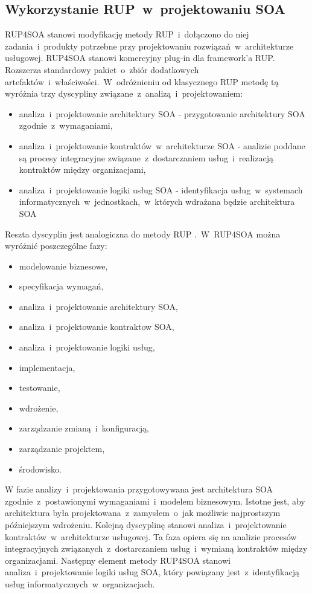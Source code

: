 \subsection{Wykorzystanie RUP~w~projektowaniu SOA}
RUP4SOA stanowi modyfikację metody RUP~i~dołączono do niej zadania~i~produkty potrzebne przy projektowaniu rozwiązań~w~architekturze usługowej. RUP4SOA stanowi komercyjny plug-in dla framework'a RUP. Rozszerza standardowy pakiet~o~zbiór dodatkowych artefaktów~i~właściwości.~W~odróżnieniu od klasycznego RUP metodę tą wyróżnia trzy dyscypliny związane~z~analizą~i~projektowaniem:
\begin{itemize}
\item{analiza~i~projektowanie architektury SOA - przygotowanie architektury SOA zgodnie~z~wymaganiami,}
\item{analiza~i~projektowanie kontraktów~w~architekturze SOA - analizie poddane są procesy integracyjne związane~z~dostarczaniem usług~i~realizacją kontraktów między organizacjami,}
\item{analiza~i~projektowanie logiki usług SOA - identyfikacja usług~w~systemach informatycznych~w~jednostkach,~w~których wdrażana będzie architektura SOA}
\end{itemize}
Reszta dyscyplin jest analogiczna do metody RUP \cite{PlatIntGor}.~W~RUP4SOA można wyróżnić poszczególne fazy:
\begin{itemize}
\item {modelowanie biznesowe,}
\item {specyfikacja wymagań,}
\item {analiza~i~projektowanie architektury SOA,}
\item {analiza~i~projektowanie kontraktow SOA,}
\item {analiza~i~projektowanie logiki usług,}
\item {implementacja,}
\item {testowanie,}
\item {wdrożenie,}
\item {zarządzanie zmianą~i~konfiguracją,}
\item {zarządzanie projektem,}
\item {środowisko.}
\end{itemize}

W fazie analizy~i~projektowania przygotowywana jest architektura SOA zgodnie~z~postawionymi wymaganiami~i~modelem biznesowym. Istotne jest, aby architektura była projektowana~z~zamysłem~o~jak możliwie najprostszym późniejszym wdrożeniu. Kolejną dyscyplinę stanowi analiza~i~projektowanie kontraktów~w~architekturze usługowej. Ta faza opiera się na analizie procesów integracyjnych związanych~z~dostarczaniem usług~i~wymianą kontraktów między organizacjami. Następny element metody RUP4SOA stanowi analiza~i~projektowanie logiki usług SOA, który powiązany jest~z~identyfikacją usług informatycznych~w~organizacjach. 

